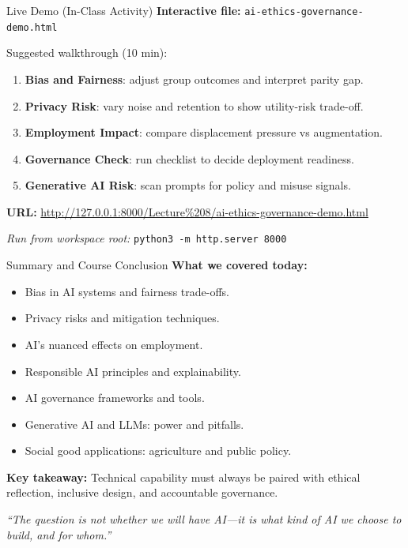 \documentclass[10pt]{beamer}
\begin{document}
\begin{frame}{Live Demo (In-Class Activity)}
    \textbf{Interactive file:} \texttt{ai-ethics-governance-demo.html}

    \vspace{0.15cm}
    Suggested walkthrough (10 min):
    \begin{enumerate}
        \item \textbf{Bias and Fairness}: adjust group outcomes and interpret parity gap.
        \item \textbf{Privacy Risk}: vary noise and retention to show utility-risk trade-off.
        \item \textbf{Employment Impact}: compare displacement pressure vs augmentation.
        \item \textbf{Governance Check}: run checklist to decide deployment readiness.
        \item \textbf{Generative AI Risk}: scan prompts for policy and misuse signals.
    \end{enumerate}

    \vspace{0.15cm}
    \small
    \textbf{URL:} \url{http://127.0.0.1:8000/Lecture%208/ai-ethics-governance-demo.html}

    \vspace{0.1cm}
    \textit{Run from workspace root:} \texttt{python3 -m http.server 8000}
\end{frame}

\begin{frame}{Summary and Course Conclusion}
    \textbf{What we covered today:}
    \begin{itemize}
        \item Bias in AI systems and fairness trade-offs.
        \item Privacy risks and mitigation techniques.
        \item AI's nuanced effects on employment.
        \item Responsible AI principles and explainability.
        \item AI governance frameworks and tools.
        \item Generative AI and LLMs: power and pitfalls.
        \item Social good applications: agriculture and public policy.
    \end{itemize}

    \vspace{0.2cm}
    \textbf{Key takeaway:}
    Technical capability must always be paired with ethical reflection, inclusive design, and accountable governance.

    \vspace{0.15cm}
    \textit{``The question is not whether we will have AI---it is what kind of AI we choose to build, and for whom.''}
\end{frame}
\end{document}
